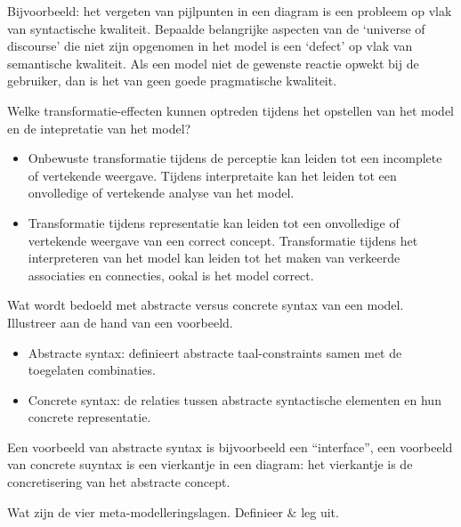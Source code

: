 \documentclass{article}
\begin{document}
Bijvoorbeeld: het vergeten van pijlpunten in een diagram is een probleem op vlak van syntactische kwaliteit. Bepaalde belangrijke aspecten van de `universe of discourse' die niet zijn opgenomen in het model is een `defect' op vlak van semantische kwaliteit. Als een model niet de gewenste reactie opwekt bij de gebruiker, dan is het van geen goede pragmatische kwaliteit.

\begin{quest}Welke transformatie-effecten kunnen optreden tijdens het opstellen van het model en de intepretatie van het model?
\end{quest}

\begin{itemize}
    \item Onbewuste transformatie tijdens de perceptie kan leiden tot een incomplete of vertekende weergave. Tijdens interpretaite kan het leiden tot een onvolledige of vertekende analyse van het model.
    \item Transformatie tijdens representatie kan leiden tot een onvolledige of vertekende weergave van een correct concept. Transformatie tijdens het interpreteren van het model kan leiden tot het maken van verkeerde associaties en connecties, ookal is het model correct.
\end{itemize}

\begin{quest}Wat wordt bedoeld met abstracte versus concrete syntax van een model. Illustreer aan de hand van een voorbeeld.\end{quest}

\begin{itemize}
    \item Abstracte syntax: definieert abstracte taal-constraints samen met de toegelaten combinaties.
    \item Concrete syntax: de relaties tussen abstracte syntactische elementen en hun concrete representatie.
\end{itemize}
Een voorbeeld van abstracte syntax is bijvoorbeeld een ``interface'', een voorbeeld van concrete suyntax is een vierkantje in een diagram: het vierkantje is de concretisering van het abstracte concept.

\begin{quest}Wat zijn de vier meta-modelleringslagen. Definieer \& leg uit. \end{quest}
\end{document}
